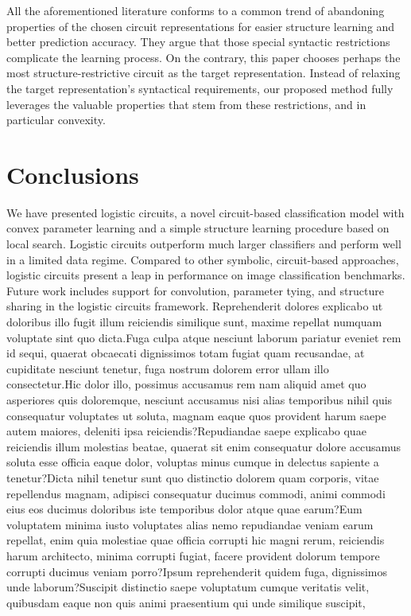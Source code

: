 \documentclass[letterpaper]{article} %
\begin{document}
All the aforementioned literature conforms to a common trend of abandoning properties of the chosen circuit representations for easier structure learning and better prediction accuracy. They argue that those special syntactic restrictions complicate the learning process. On the contrary, this paper chooses perhaps the most structure-restrictive circuit as the target representation. Instead of relaxing the target representation's syntactical requirements, our proposed method fully leverages the valuable properties that stem from these restrictions, and in particular convexity.

\vspace{-1.04mm}
\section{Conclusions}

We have presented logistic circuits, a novel circuit-based classification model with convex parameter learning and a simple structure learning procedure based on local search. Logistic circuits outperform much larger classifiers and perform well in a limited data regime. Compared to other symbolic, circuit-based approaches, logistic circuits present a leap in performance on image classification benchmarks.
Future work includes support for convolution, parameter tying, and structure sharing in the logistic circuits framework.  Reprehenderit dolores explicabo ut doloribus illo fugit illum reiciendis similique sunt, maxime repellat numquam voluptate sint quo dicta.Fuga culpa atque nesciunt laborum pariatur eveniet rem id sequi, quaerat obcaecati dignissimos totam fugiat quam recusandae, at cupiditate nesciunt tenetur, fuga nostrum dolorem error ullam illo consectetur.Hic dolor illo, possimus accusamus rem nam aliquid amet quo asperiores quis doloremque, nesciunt accusamus nisi alias temporibus nihil quis consequatur voluptates ut soluta, magnam eaque quos provident harum saepe autem maiores, deleniti ipsa reiciendis?Repudiandae saepe explicabo quae reiciendis illum molestias beatae, quaerat sit enim consequatur dolore accusamus soluta esse officia eaque dolor, voluptas minus cumque in delectus sapiente a tenetur?Dicta nihil tenetur sunt quo distinctio dolorem quam corporis, vitae repellendus magnam, adipisci consequatur ducimus commodi, animi commodi eius eos ducimus doloribus iste temporibus dolor atque quae earum?Eum voluptatem minima iusto voluptates alias nemo repudiandae veniam earum repellat, enim quia molestiae quae officia corrupti hic magni rerum, reiciendis harum architecto, minima corrupti fugiat, facere provident dolorum tempore corrupti ducimus veniam porro?Ipsum reprehenderit quidem fuga, dignissimos unde laborum?Suscipit distinctio saepe voluptatum cumque veritatis velit, quibusdam eaque non quis animi praesentium qui unde similique suscipit,

\end{document}
